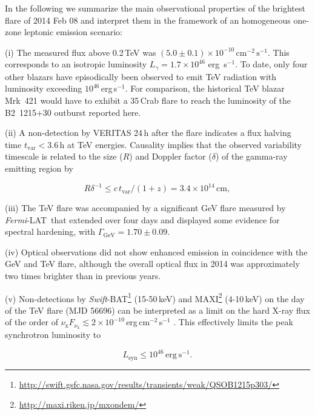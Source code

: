 \documentclass[twocolumn]{aastex6}
\def\b2{B2~1215+30}
\def\lat{\textit{Fermi}-LAT}
\begin{document}
In the following we summarize the main observational properties of the brightest flare of 2014 Feb 08 and interpret them in the framework of an homogeneous one-zone leptonic emission scenario:

(i) The measured flux above 0.2\,TeV was $\left(5.0 \pm 0.1 \right) \times 10^{-10}\,\mathrm{cm}^{-2}\,\mathrm{s}^{-1}$. 
This corresponds to an isotropic luminosity $L_\gamma = 1.7 \times 10^{46}$ erg~s$^{-1}$.  
To date, only four other blazars 
have episodically been observed to emit TeV radiation with luminosity exceeding $10^{46}$\,erg\,s$^{-1}$.
For comparison, the historical TeV blazar Mrk~421 
would have to exhibit a 35\,Crab flare to reach the luminosity of the \b2 outburst reported here.

(ii) 
A non-detection by VERITAS 24\,h after the flare 
indicates a flux halving time $t_\mathrm{var}<3.6$\,h at TeV energies. 
Causality implies that the observed variability timescale is related to the size ($R$) and Doppler factor ($\delta$) of the gamma-ray emitting region by
\begin{linenomath}
\begin{equation}
R \delta^{-1} \leq c\,t_{\mathrm{var}}/(1+z) = 3.4 \times 10^{14}\,\mathrm{cm},
\label{causality}
\end{equation}
\end{linenomath}

(iii) The TeV flare was accompanied by a significant GeV flare measured by \lat\ that extended over four days and displayed some evidence for spectral hardening, with $\Gamma_\mathrm{GeV} = 1.70 \pm 0.09$. 

(iv) Optical observations did not show enhanced emission in coincidence with the GeV and TeV flare, although the overall optical flux in 2014 was approximately two times brighter than in previous years.

(v) Non-detections by {\it Swift}-BAT\footnote{ \url{http://swift.gsfc.nasa.gov/results/transients/weak/QSOB1215p303/}} (15-50\,keV) and MAXI\footnote{ \url{http://maxi.riken.jp/mxondem/}} (4-10\,keV) on the day of the TeV flare (MJD 56696) can be interpreted as a limit on the hard X-ray flux of the order of $\nu_\mathrm{x} F_{\nu_\mathrm{x}} \lesssim 2 \times 10^{-10}$\,erg\,cm$^{-2}$\,s$^{-1}$ \citep{bat,maxi}. This effectively limits the peak synchrotron luminosity to 
\begin{linenomath}
\begin{equation}
L_\mathrm{syn} \leq 10^{46}\,\mathrm{erg}~\mathrm{s}^{-1}.
\label{Lsy}
\end{equation}
\end{linenomath}
\end{document}
